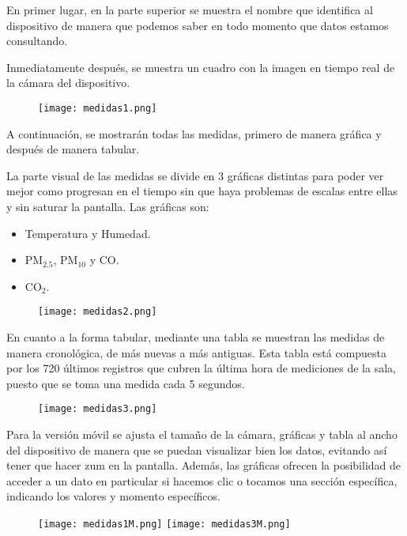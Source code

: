 En primer lugar, en la parte superior se muestra el nombre que identifica al dispositivo de manera que podemos saber en todo momento que datos estamos consultando.

Inmediatamente después, se muestra un cuadro con la imagen en tiempo real de la cámara del dispositivo.
\begin{figure}[H]
	{\texttt{[image: medidas1.png]}}
\end{figure}
A continuación, se mostrarán todas las medidas, primero de manera gráfica y después de manera tabular.

La parte visual de las medidas se divide en 3 gráficas distintas para poder ver mejor como progresan en el tiempo sin que haya problemas de escalas entre ellas y sin saturar la pantalla. Las gráficas son:
\begin{itemize}
	\item Temperatura y Humedad.
	\item PM$_{2.5}$, PM$_{10}$ y CO.
	\item CO$_2$.
\end{itemize}
\begin{figure}[H]
	{\texttt{[image: medidas2.png]}}
\end{figure}
En cuanto a la forma tabular, mediante una tabla se muestran las medidas de manera cronológica, de más nuevas a más antiguas. Esta tabla está compuesta por los 720 últimos registros que cubren la última hora de mediciones de la sala, puesto que se toma una medida cada 5 segundos.
\begin{figure}[H]
	{\texttt{[image: medidas3.png]}}
\end{figure}

Para la versión móvil se ajusta el tamaño de la cámara, gráficas y tabla al ancho del dispositivo de manera que se puedan visualizar bien los datos, evitando así tener que hacer zum en la pantalla. Además, las gráficas ofrecen la posibilidad de acceder a un dato en particular si hacemos clic o tocamos una sección específica, indicando los valores y momento específicos.
\begin{figure}[H]
	{\texttt{[image: medidas1M.png]}
		\texttt{[image: medidas3M.png]}}
\end{figure}

